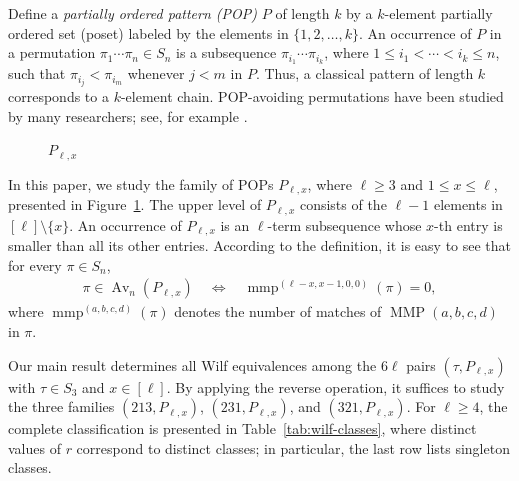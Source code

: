 \documentclass[11pt]{article}
\begin{document}
Define a \emph{partially ordered pattern ({POP})} $P$ of length $k$ by a $k$-element partially ordered set (poset) labeled by the elements in $\{1,2,\ldots,k\}$.
An occurrence of $P$ in a permutation $\pi_1\cdots\pi_n\in S_n$ is a subsequence $\pi_{i_1}\cdots\pi_{i_k}$, 
where $1\le i_1<\cdots< i_k\le n$, such that $\pi_{i_j}<\pi_{i_m}$ whenever $j<m$ in $P$. 
Thus, a classical pattern of length $k$ corresponds to a $k$-element chain.
POP-avoiding permutations have been studied by many researchers; 
see, for example \cite{BursteinKitaev2008,Kitaev2007,WangYan}.

\begin{figure}[ht]
\centering
{}
\caption{$P_{\ell,x}$}
\label{fig:Pellx}
\end{figure}


In this paper, we study the family of POPs $P_{\ell,x}$, where
$\ell\geq3$ and $1\leq x\leq\ell$, presented in Figure~\ref{fig:Pellx}.
The upper level of $P_{\ell,x}$ consists of the $\ell-1$ elements in
$[\ell]\setminus\{x\}$.
An occurrence of $P_{\ell,x}$ is an $\ell$-term subsequence whose
$x$-th entry is smaller than all its other entries. 
According to the definition, it is easy to see that for every
$\pi\in S_n$,
\begin{align*}
  \pi\in\operatorname{Av}_n(P_{\ell,x})
  \quad\Longleftrightarrow\quad
  \operatorname{mmp}^{(\ell-x,x-1,0,0)}(\pi)=0,
\end{align*}
where $\operatorname{mmp}^{(a,b,c,d)}(\pi)$ denotes the number of matches of
$\operatorname{MMP}(a,b,c,d)$ in $\pi$.  

Our main result determines all Wilf equivalences among the $6\ell$ pairs
$(\tau,P_{\ell,x})$ with $\tau\in S_3$ and $x\in[\ell]$.
By applying the reverse operation, it suffices to study the three families
$(213,P_{\ell,x})$, $(231,P_{\ell,x})$, and $(321,P_{\ell,x})$.
For $\ell\geq4$, the complete classification is presented in Table~\ref{tab:wilf-classes}, where distinct values of $r$ correspond to distinct classes; in particular, the last row lists singleton classes.
\end{document}
